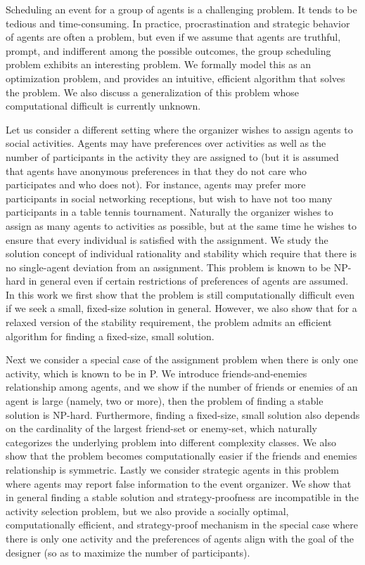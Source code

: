 Scheduling an event for a group of agents is a challenging problem. 
It tends to be tedious and time-consuming. 
In practice, procrastination and strategic behavior of agents are often a problem, but even if we assume that agents are truthful, prompt, and indifferent among the possible outcomes, the group scheduling problem exhibits an interesting problem. 
We formally model this as an optimization problem, and provides an intuitive, efficient algorithm that solves the problem. 
We also discuss a generalization of this problem whose computational difficult is currently unknown.

Let us consider a different setting where the organizer wishes to assign agents to social activities. Agents may have preferences over activities as well as the number of participants in the activity they are assigned to (but it is assumed that agents have anonymous preferences in that they do not care who participates and who does not). For instance, agents may prefer more participants in social networking receptions, but wish to have not too many participants in a table tennis tournament. Naturally the organizer wishes to assign as many agents to activities as possible, but at the same time he wishes to ensure that every individual is satisfied with the assignment. We study the solution concept of individual rationality and stability which require that there is no single-agent deviation from an assignment. This problem is known to be NP-hard in general even if certain restrictions of preferences of agents are assumed. In this work we first show that the problem is still computationally difficult even if we seek a small, fixed-size solution in general. However, we also show that for a relaxed version of the stability requirement, the problem admits an efficient algorithm for finding a fixed-size, small solution.

Next we consider a special case of the assignment problem when there is only one activity, which is known to be in P. We introduce friends-and-enemies relationship among agents, and we show if the number of friends or enemies of an agent is large (namely, two or more), then the problem of finding a stable solution is NP-hard. Furthermore, finding a fixed-size, small solution also depends on the cardinality of the largest friend-set or enemy-set, which naturally categorizes the underlying problem into different complexity classes. We also show that the problem becomes computationally easier if the friends and enemies relationship is symmetric.
Lastly we consider strategic agents in this problem where agents may report false information to the event organizer. We show that in general finding a stable solution and strategy-proofness are incompatible in the activity selection problem, but we also provide a socially optimal, computationally efficient, and strategy-proof mechanism in the special case where there is only one activity and the preferences of agents align with the goal of the designer (so as to maximize the number of participants).

